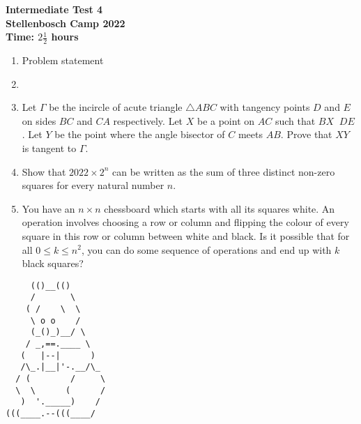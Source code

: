 \documentclass{article}
\begin{document}
\thispagestyle{empty}

\begin{center}
  \textbf{\Large Intermediate Test 4}
  \\ \vspace{1em}
  \textbf{\large Stellenbosch Camp 2022}
  \\ \vspace{1em}
  \textbf{\large Time: $2\frac{1}{2}$ hours}
\end{center}

\bigskip

\begin{enumerate}[itemsep=\fill]

\item %
Problem statement


\item %


\item %
Let $\Gamma$ be the incircle of acute triangle $\triangle ABC$ with tangency points $D$ and $E$ on sides $BC$ and $CA$ respectively. Let $X$ be a point on $AC$ such that $BX\mathop{||}DE$. Let $Y$ be the point where the angle bisector of $C$ meets $AB$. Prove that $XY$ is tangent to $\Gamma$.

\item %
Show that $2022 \times 2^n$ can be written as the sum of three distinct non-zero squares for every natural number $n$.


\item %
You have an $n \times n$ chessboard which starts with all its squares white.
An operation involves choosing a row or column and flipping the colour of every square in this row or column between white and black.
Is it possible that for all $0 \leq k \leq n^2$, you can do some sequence of operations and end up with $k$ black squares?

\end{enumerate}


\vfill
\centering
\small
\begin{BVerbatim}
     (()__(()
     /       \ 
    ( /    \  \
     \ o o    /
     (_()_)__/ \             
    / _,==.____ \
   (   |--|      )
   /\_.|__|'-.__/\_
  / (        /     \ 
  \  \      (      /
   )  '._____)    /    
(((____.--(((____/
\end{BVerbatim}
\end{document}
